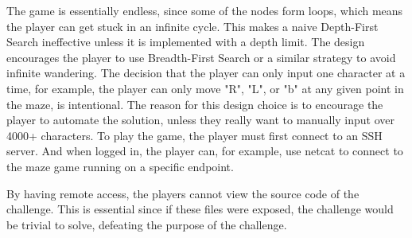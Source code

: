 

The game is essentially endless, since some of the nodes form loops, which means the player can get stuck in an infinite cycle. This makes a naive Depth-First Search ineffective unless it is implemented with a depth limit. The design encourages the player to use Breadth-First Search or a similar strategy to avoid infinite wandering. The decision that the player can only input one character at a time, for example, the player can only move "R", "L", or "b" at any given point in the maze, is intentional. The reason for this design choice is to encourage the player to automate the solution, unless they really want to manually input over 4000+ characters. To play the game, the player must first connect to an SSH server. And when logged in, the player can, for example, use netcat to connect to the maze game running on a specific endpoint. 



By having remote access, the players cannot view the source code of the challenge. This is essential since if these files were exposed, the challenge would be trivial to solve, defeating the purpose of the challenge.






